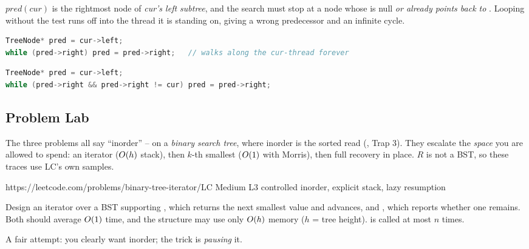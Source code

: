 \begin{warningbox}
$\mathit{pred}(\mathit{cur})$ is the rightmost node of \emph{cur's left subtree}, and the
search must stop at a node whose  is null \emph{or already points back to
}. Looping  without the  test runs off
into the thread it is standing on, giving a wrong predecessor and an infinite cycle.
\end{warningbox}
\begin{lstlisting}[caption={\textcolor{warningred}{WRONG}: does not detect its own thread}, language=C++, basicstyle=\ttfamily\small]
TreeNode* pred = cur->left;
while (pred->right) pred = pred->right;   // walks along the cur-thread forever
\end{lstlisting}
\begin{lstlisting}[caption={\textcolor{successgreen}{RIGHT}: stop at null or at the back-edge to cur}, language=C++, basicstyle=\ttfamily\small]
TreeNode* pred = cur->left;
while (pred->right && pred->right != cur) pred = pred->right;
\end{lstlisting}


\subsection{Problem Lab}

The three problems all say ``inorder'' -- on a \emph{binary search tree}, where inorder
is the sorted read (, Trap 3). They escalate the \emph{space} you are
allowed to spend: an iterator ($O(h)$ stack), then $k$-th smallest ($O(1)$ with
Morris), then full recovery in place. $R$ is not a BST, so these traces use LC's own
samples.

  {https://leetcode.com/problems/binary-tree-iterator/}{LC Medium L3}
  {controlled inorder, explicit stack, lazy resumption}

\begin{problemstatement}
Design an iterator over a BST supporting , which returns the next smallest
value and advances, and , which reports whether one remains. Both should
average $O(1)$ time, and the structure may use only $O(h)$ memory ($h$ = tree
height).  is called at most $n$ times.
\end{problemstatement}

\begin{attemptgate}
A fair attempt: you clearly want inorder; the trick is \emph{pausing} it.
\end{attemptgate}

